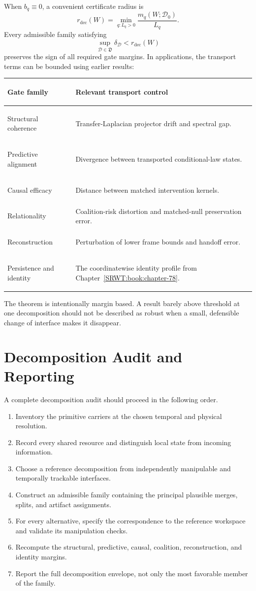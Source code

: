 When \(b_q\equiv0\), a convenient certificate radius is
\[
\boxed{
r_{\mathrm{dec}}(W)
=
\min_{q:L_q>0}
\frac{m_q(W;\mathcal D_0)}{L_q}.
}
\]
Every admissible family satisfying
\[
\sup_{\mathcal D\in\mathfrak D}\delta_{\mathcal D}
<
r_{\mathrm{dec}}(W)
\]
preserves the sign of all required gate margins. In applications, the
transport terms can be bounded using earlier results:
\begin{center}
\small
\begin{tabularx}{\textwidth}{@{}>{\bfseries\raggedright\arraybackslash}p{}>{\raggedright\arraybackslash}X@{}}
\toprule
Gate family & Relevant transport control \\
\midrule
Structural coherence & Transfer-Laplacian projector drift and spectral gap. \\
Predictive alignment & Divergence between transported conditional-law states. \\
Causal efficacy & Distance between matched intervention kernels. \\
Relationality & Coalition-risk distortion and matched-null preservation error. \\
Reconstruction & Perturbation of lower frame bounds and handoff error. \\
Persistence and identity & The coordinatewise identity profile from Chapter~\ref{SRWT:book:chapter-78}. \\
\bottomrule
\end{tabularx}
\end{center}

The theorem is intentionally margin based. A result barely above threshold at
one decomposition should not be described as robust when a small, defensible
change of interface makes it disappear.

\section{Decomposition Audit and Reporting}

A complete decomposition audit should proceed in the following order.
\begin{enumerate}
\item Inventory the primitive carriers at the chosen temporal and physical
 resolution.
\item Record every shared resource and distinguish local state from incoming
 information.
\item Choose a reference decomposition from independently manipulable and
 temporally trackable interfaces.
\item Construct an admissible family containing the principal plausible
 merges, splits, and artifact assignments.
\item For every alternative, specify the correspondence to the reference
 workspace and validate its manipulation checks.
\item Recompute the structural, predictive, causal, coalition, reconstruction,
 and identity margins.
\item Report the full decomposition envelope, not only the most favorable
 member of the family.
\end{enumerate}

